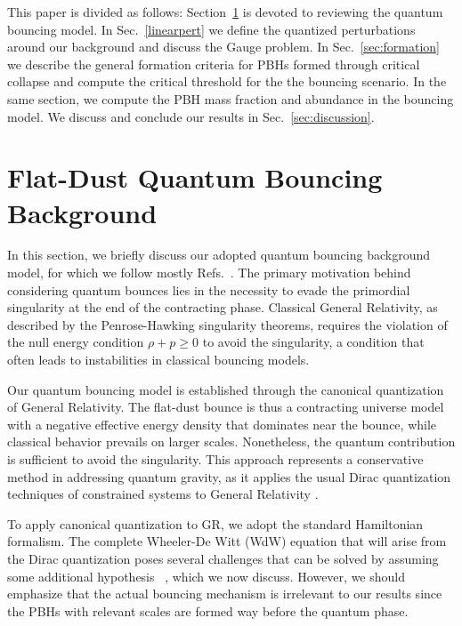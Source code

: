 \documentclass[a4paper,11pt]{article}
\begin{document}
This paper is divided as follows: Section~\ref{sec:bounce} is devoted to reviewing the quantum bouncing model. In Sec.~\ref{linearpert} we define the quantized perturbations around our background and discuss the Gauge problem. In Sec.~\ref{sec:formation} we describe the general formation criteria for PBHs formed through critical collapse and compute the critical threshold for the the bouncing scenario. In the same section, we compute the PBH mass fraction and abundance in the bouncing model. We discuss and conclude our results in Sec.~\ref{sec:discussion}.





\section{Flat-Dust Quantum Bouncing Background}
\label{sec:bounce}

        In this section, we briefly discuss our adopted quantum bouncing background model, for which we follow mostly Refs.~\cite{nelson_peter_bouncing_original,nelson2021bouncing}. The primary motivation behind considering quantum bounces lies in the necessity to evade the primordial singularity at the end of the contracting phase. Classical General Relativity, as described by the Penrose-Hawking singularity theorems, requires the violation of the null energy condition $\rho + p \geq 0$ to avoid the singularity, a condition that often leads to instabilities in classical bouncing models.
        
        Our quantum bouncing model is established through the canonical quantization of General Relativity. The flat-dust bounce is thus a contracting universe model with a negative effective energy density that dominates near the bounce, while classical behavior prevails on larger scales. Nonetheless, the quantum contribution is sufficient to avoid the singularity.
        This approach represents a conservative method in addressing quantum gravity, as it applies the usual Dirac quantization techniques of constrained systems to General Relativity \cite{nelsonhamiltonian}. 

        To apply canonical quantization to GR, we adopt the standard Hamiltonian formalism.  The complete Wheeler-De Witt (WdW) equation that will arise from the Dirac quantization poses several challenges that can be solved by assuming some additional hypothesis ~\cite{nelson2000bohm,halliwell1990introductory,nelson2021bouncing,nelson_bohm2023}, which we now discuss.  However, we should emphasize that the actual bouncing mechanism is irrelevant to our results since the PBHs with relevant scales are formed way before the quantum phase.
\end{document}
